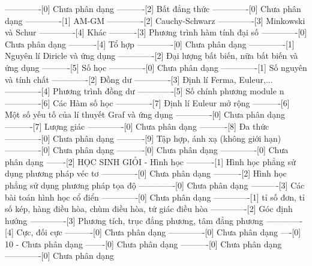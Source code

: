 -------------[0] Chưa phân dạng
----------[2] Bất đẳng thức
-------------[0] Chưa phân dạng
-------------[1] AM-GM
-------------[2] Cauchy-Schwarz
-------------[3] Minkowski và Schur
-------------[4] Khác
----------[3] Phương trình hàm tính đại số
-------------[0] Chưa phân dạng
----------[4] Tổ hợp 
-------------[0] Chưa phân dạng
-------------[1] Nguyên lí Diricle và ứng dụng
-------------[2] Đại lượng bất biến, nữa bất biến và ứng dụng
----------[5] Số học 
-------------[0] Chưa phân dạng
-------------[1] Số nguyên và tính chất
-------------[2] Đồng dư
-------------[3] Định lí Ferma, Euleur,...
-------------[4] Phương trình đồng dư
-------------[5] Số chính phương module n
-------------[6] Các Hàm số học
-------------[7] Định lí Euleur mở rộng
----------[6] Một số yếu tố của lí thuyết Graf và ứng dụng
-------------[0] Chưa phân dạng
----------[7] Lượng giác
-------------[0] Chưa phân dạng
----------[8] Đa thức
-------------[0] Chưa phân dạng
----------[9] Tập hợp, ánh xạ (không giới hạn)
-------------[0] Chưa phân dạng
----------[0] Chưa phân dạng
-------------[0] Chưa phân dạng
-------[2] HỌC SINH GIỎI - Hình học
----------[1] Hình học phẳng sử dụng phương pháp véc tơ
-------------[0] Chưa phân dạng
----------[2] Hình học phẳng sử dụng phương pháp tọa độ
-------------[0] Chưa phân dạng
----------[3] Các bài toán hình học cổ điển
-------------[0] Chưa phân dạng
-------------[1] tỉ số đơn, tỉ số kép, hàng điều hòa, chùm điều hòa, tứ giác điều hòa
-------------[2] Góc định hướng
-------------[3] Phương tích, trục đẳng phương, tâm đẳng phương
-------------[4] Cực, đối cực
----------[0] Chưa phân dạng
-------------[0] Chưa phân dạng
----[0] 10 - Chưa phân dạng
-------[0] Chưa phân dạng
----------[0] Chưa phân dạng
-------------[0] Chưa phân dạng

